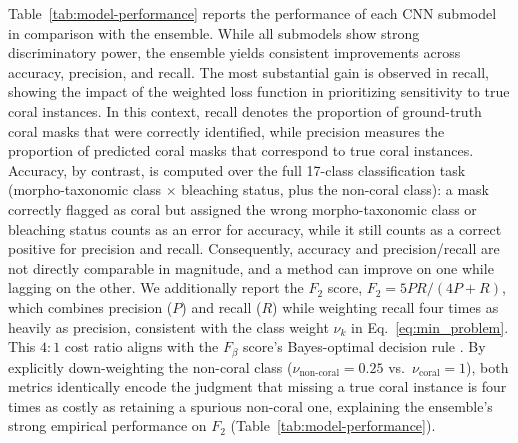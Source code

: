 \documentclass[11pt]{elsarticle}
\begin{document}
Table~\ref{tab:model-performance} reports the performance of each CNN submodel in comparison with the ensemble. While all submodels show strong discriminatory power, the ensemble yields consistent improvements across accuracy, precision, and recall. The most substantial gain is observed in recall, showing the impact of the weighted loss function in prioritizing sensitivity to true coral instances. In this context, recall denotes the proportion of ground-truth coral masks that were correctly identified, while precision measures the proportion of predicted coral masks that correspond to true coral instances. Accuracy, by contrast, is computed over the full 17-class classification task (morpho-taxonomic class $\times$ bleaching status, plus the non-coral class): a mask correctly flagged as coral but assigned the wrong morpho-taxonomic class or bleaching status counts as an error for accuracy, while it still counts as a correct positive for precision and recall. Consequently, accuracy and precision/recall are not directly comparable in magnitude, and a method can improve on one while lagging on the other. We additionally report the $F_2$ score, $F_2 = 5PR/(4P+R)$, which combines precision ($P$) and recall ($R$) while weighting recall four times as heavily as precision, consistent with the class weight $\nu_k$ in Eq.~\ref{eq:min_problem}. This $4{:}1$ cost ratio aligns with the $F_\beta$ score's Bayes-optimal decision rule \citep{lipton2014fbeta}. By explicitly down-weighting the non-coral class ($\nu_{\text{non-coral}} = 0.25$ vs.\ $\nu_{\text{coral}} = 1$), both metrics identically encode the judgment that missing a true coral instance is four times as costly as retaining a spurious non-coral one, explaining the ensemble's strong empirical performance on $F_2$ (Table~\ref{tab:model-performance}).
\end{document}
